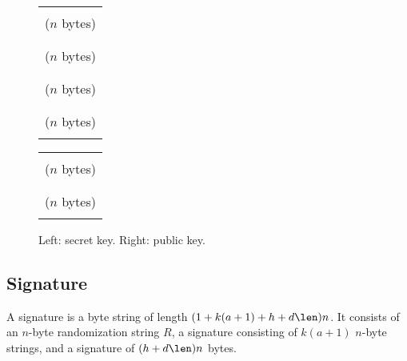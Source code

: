 \begin{figure} [h]
  \begin{center}
  \begin{minipage}{.4\textwidth}
        \begin{center}
	  \begin{tabular}{|c|}
	    \hline
	    \\[-0.5em] \sseed ($n$ bytes) \\[-0.5em] \\ \hline
	    \\[-0.5em] \skprf ($n$ bytes) \\[-0.5em] \\ \hline
	    \\[-0.5em] \pseed ($n$ bytes) \\[-0.5em] \\ \hline
	    \\[-0.5em] \proot ($n$ bytes) \\[-0.5em] \\ \hline
	  \end{tabular}
        \end{center}
      \end{minipage}
  \begin{minipage}{.4\textwidth}
      \begin{center}
	\begin{tabular}{|c|}
	    \hline
	    \\[-0.5em] \pseed ($n$ bytes) \\[-0.5em] \\ \hline
	    \\[-0.5em] \proot ($n$ bytes) \\[-0.5em] \\ \hline
	  \end{tabular}
        \end{center}
      \end{minipage}
  \end{center}
  \caption{Left: \spx secret key. Right: \spx public key.} 
  \label{fig:spx:keys}
\end{figure}

\subsection{\spx Signature}

   A \spx signature \htsig is a byte string of length $(1 + k(a + 1) + h + d\len)n$.  
   It consists of an $n$-byte randomization string $R$, a \fors signature 
   \forssig consisting of $k(a+1)$ $n$-byte strings, and a \hyper signature \htsig 
   of $(h + d\len)n$ bytes.
   
